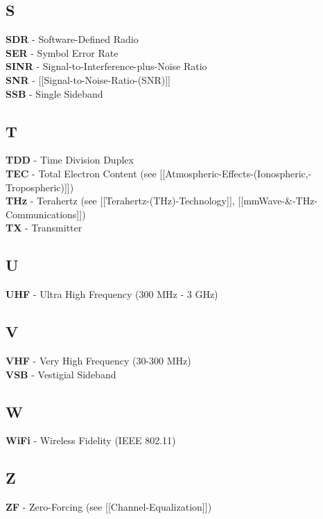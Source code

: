 \subsection{S}\label{s}

\textbf{SDR} - Software-Defined Radio\\
\textbf{SER} - Symbol Error Rate\\
\textbf{SINR} - Signal-to-Interference-plus-Noise Ratio\\
\textbf{SNR} - {[}{[}Signal-to-Noise-Ratio-(SNR){]}{]}\\
\textbf{SSB} - Single Sideband

\subsection{T}\label{t}

\textbf{TDD} - Time Division Duplex\\
\textbf{TEC} - Total Electron Content (see
{[}{[}Atmospheric-Effects-(Ionospheric,-Tropospheric){]}{]})\\
\textbf{THz} - Terahertz (see {[}{[}Terahertz-(THz)-Technology{]}{]},
{[}{[}mmWave-\&-THz-Communications{]}{]})\\
\textbf{TX} - Transmitter

\subsection{U}\label{u}

\textbf{UHF} - Ultra High Frequency (300 MHz - 3 GHz)

\subsection{V}\label{v}

\textbf{VHF} - Very High Frequency (30-300 MHz)\\
\textbf{VSB} - Vestigial Sideband

\subsection{W}\label{w}

\textbf{WiFi} - Wireless Fidelity (IEEE 802.11)

\subsection{Z}\label{z}

\textbf{ZF} - Zero-Forcing (see {[}{[}Channel-Equalization{]}{]})

